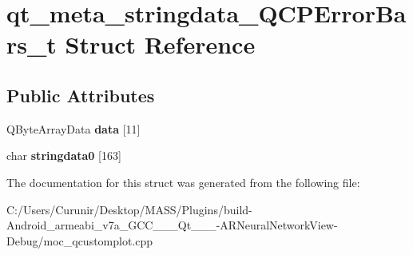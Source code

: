 \hypertarget{structqt__meta__stringdata___q_c_p_error_bars__t}{}\section{qt\+\_\+meta\+\_\+stringdata\+\_\+\+Q\+C\+P\+Error\+Bars\+\_\+t Struct Reference}
\label{structqt__meta__stringdata___q_c_p_error_bars__t}
\subsection*{Public Attributes}
\begin{DoxyCompactItemize}
\item 
\mbox{\label{structqt__meta__stringdata___q_c_p_error_bars__t_a0c1d81402f426451de67539634bc394f}} 
Q\+Byte\+Array\+Data {\bfseries data} \mbox{[}11\mbox{]}
\item 
\mbox{\label{structqt__meta__stringdata___q_c_p_error_bars__t_a4156125b9e0e682b9aa12e7d2da870be}} 
char {\bfseries stringdata0} \mbox{[}163\mbox{]}
\end{DoxyCompactItemize}


The documentation for this struct was generated from the following file\+:\begin{DoxyCompactItemize}
\item 
C\+:/\+Users/\+Curunir/\+Desktop/\+M\+A\+S\+S/\+Plugins/build-\/\+Android\+\_\+armeabi\+\_\+v7a\+\_\+\+G\+C\+C\+\_\+\_\+\_\+\+Qt\+\_\+\_\+\_-\/\+A\+R\+Neural\+Network\+View-\/\+Debug/moc\+\_\+qcustomplot.\+cpp\end{DoxyCompactItemize}
